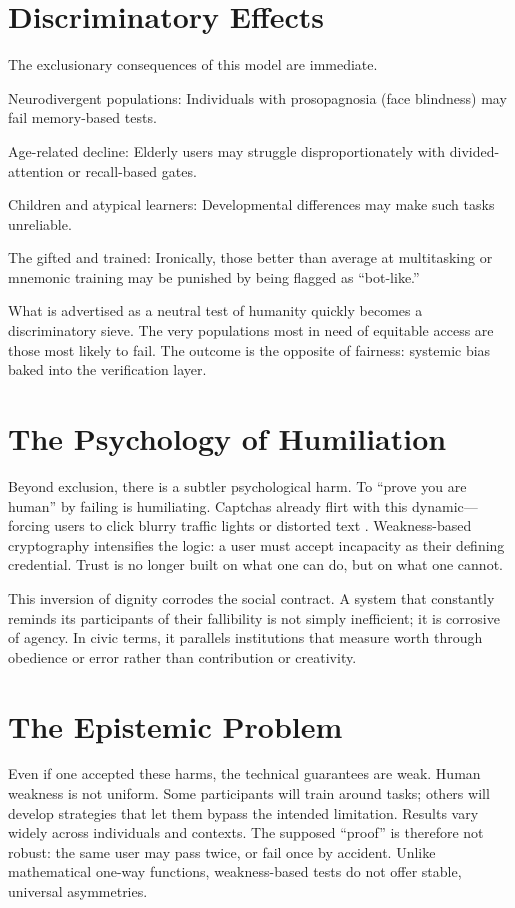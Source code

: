 \documentclass{book}
\begin{document}
\section{Discriminatory Effects}

The exclusionary consequences of this model are immediate.

Neurodivergent populations: Individuals with prosopagnosia (face blindness) may fail memory-based tests.

Age-related decline: Elderly users may struggle disproportionately with divided-attention or recall-based gates.

Children and atypical learners: Developmental differences may make such tasks unreliable.

The gifted and trained: Ironically, those better than average at multitasking or mnemonic training may be punished by being flagged as “bot-like.”

What is advertised as a neutral test of humanity quickly becomes a discriminatory sieve. The very populations most in need of equitable access are those most likely to fail. The outcome is the opposite of fairness: systemic bias baked into the verification layer.

\section{The Psychology of Humiliation}

Beyond exclusion, there is a subtler psychological harm. To “prove you are human” by failing is humiliating. Captchas already flirt with this dynamic—forcing users to click blurry traffic lights or distorted text \cite{vonahn2003}. Weakness-based cryptography intensifies the logic: a user must accept incapacity as their defining credential. Trust is no longer built on what one can do, but on what one cannot.

This inversion of dignity corrodes the social contract. A system that constantly reminds its participants of their fallibility is not simply inefficient; it is corrosive of agency. In civic terms, it parallels institutions that measure worth through obedience or error rather than contribution or creativity.

\section{The Epistemic Problem}

Even if one accepted these harms, the technical guarantees are weak. Human weakness is not uniform. Some participants will train around tasks; others will develop strategies that let them bypass the intended limitation. Results vary widely across individuals and contexts. The supposed “proof” is therefore not robust: the same user may pass twice, or fail once by accident. Unlike mathematical one-way functions, weakness-based tests do not offer stable, universal asymmetries.
\end{document}
